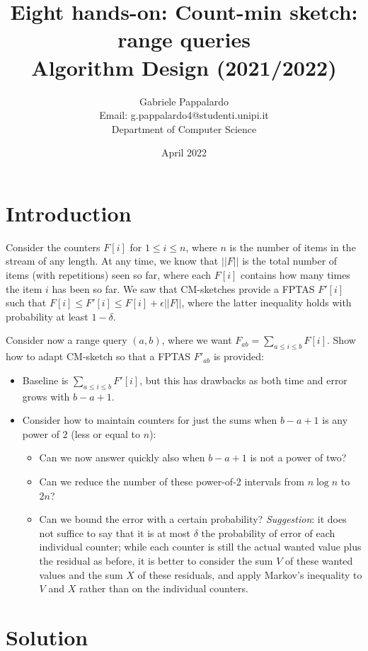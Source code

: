 \documentclass{article}
\title{Eight hands-on: Count-min sketch: range queries\\[1ex] \large Algorithm Design (2021/2022)}
\author{Gabriele Pappalardo\\Email: g.pappalardo4@studenti.unipi.it\\Department of Computer Science}
\date{April 2022}
\begin{document}
\maketitle

\section{Introduction}

Consider the counters $F[i]$ for $1 \le i \le n$, where $n$ is the number of items in the stream of any length. 
At any time, we know that $|| F ||$ is the total number of items (with repetitions) seen so far, where each 
$F[i]$ contains how many times the item $i$ has been so far.  
We saw that CM-sketches provide a FPTAS $F'[i]$ such that $F[i] \le F'[i] \le F[i] + \epsilon  ||F||$, 
where the latter inequality holds with probability at least $1 - \delta$.\newline

\noindent Consider now a range query $(a,b)$, where we want $F_{ab} = \sum_{a \le i \le b} F[i]$. Show how to adapt CM-sketch so that a FPTAS $F'_{ab}$ is provided: 

\begin{itemize}
    \item Baseline is $\sum_{a \le i \le b} F'[i]$, but this has drawbacks as both time and error grows with $b-a+1$.
    \item Consider how to maintain counters for just the sums when $b-a+1$ is any power of $2$ (less or equal to $n$):
    \begin{itemize}
        \item Can we now answer quickly also when $b-a+1$ is not a power of two? 
        \item Can we reduce the number of these power-of-2 intervals from $n \log n$ to $2n$?
        \item Can we bound the error with a certain probability? \textit{Suggestion}: it does not suffice to say that it is at most $\delta$ 
        the probability of error of each individual counter; while each counter is still the actual wanted value plus the residual as before, 
        it is better to consider the sum $V$ of these wanted values and the sum $X$ of these residuals, and apply Markov’s inequality to $V$ and $X$ 
        rather than on the individual counters.  
    \end{itemize} 
\end{itemize}

\section{Solution}
\end{document}
